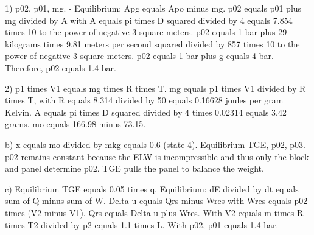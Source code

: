 1) p02, p01, mg.
- Equilibrium: Apg equals Apo minus mg.
p02 equals p01 plus mg divided by A with A equals pi times D squared divided by 4 equals 7.854 times 10 to the power of negative 3 square meters.
p02 equals 1 bar plus 29 kilograms times 9.81 meters per second squared divided by 857 times 10 to the power of negative 3 square meters.
p02 equals 1 bar plus g equals 4 bar.
Therefore, p02 equals 1.4 bar.

2) p1 times V1 equals mg times R times T.
mg equals p1 times V1 divided by R times T, with R equals 8.314 divided by 50 equals 0.16628 joules per gram Kelvin.
A equals pi times D squared divided by 4 times 0.02314 equals 3.42 grams.
mo equals 166.98 minus 73.15.

b) x equals mo divided by mkg equals 0.6 (state 4).
Equilibrium TGE, p02, p03.
p02 remains constant because the ELW is incompressible and thus only the block and panel determine p02.
TGE pulls the panel to balance the weight.

c) Equilibrium TGE equals 0.05 times q.
Equilibrium: dE divided by dt equals sum of Q minus sum of W.
Delta u equals Qrs minus Wres with Wres equals p02 times (V2 minus V1).
Qrs equals Delta u plus Wres.
With V2 equals m times R times T2 divided by p2 equals 1.1 times L.
With p02, p01 equals 1.4 bar.